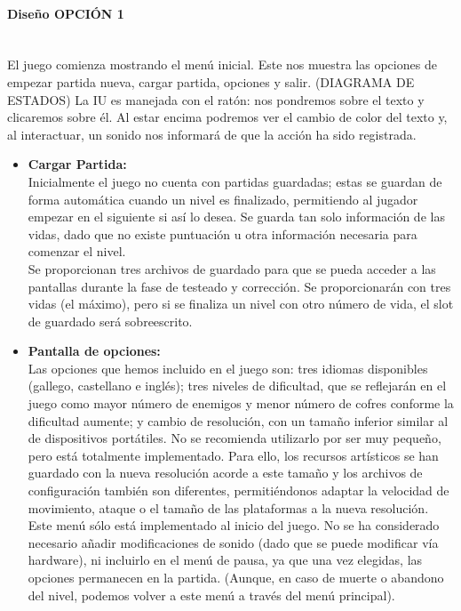 \documentclass[12pt,a4paper,twoside,spanish]{article}      %
\begin{document}
\paragraph{Diseño OPCIÓN 1}\mbox{}\\

El juego comienza mostrando el menú inicial. Este nos muestra las opciones de empezar partida nueva, cargar partida, opciones y salir. (DIAGRAMA DE ESTADOS) La IU es manejada con el ratón: nos pondremos sobre el texto y clicaremos sobre él. Al estar encima podremos ver el cambio de color del texto y, al interactuar, un sonido nos informará de que la acción ha sido registrada.

\begin{itemize}
    \item \textbf{Cargar Partida:}\\[1mm]
    Inicialmente el juego no cuenta con partidas guardadas; estas se guardan de forma automática cuando un nivel es finalizado, permitiendo al jugador empezar en el siguiente si así lo desea. Se guarda tan solo información de las vidas, dado que no existe puntuación u otra información necesaria para comenzar el nivel.\\[1mm]
    Se proporcionan tres archivos de guardado para que se pueda acceder a las pantallas durante la fase de testeado y corrección. Se proporcionarán con tres vidas (el máximo), pero si se finaliza un nivel con otro número de vida, el slot de guardado será sobreescrito.

    \item \textbf{Pantalla de opciones:}\\[1mm]
    Las opciones que hemos incluido en el juego son: tres idiomas disponibles (gallego, castellano e inglés); tres niveles de dificultad, que se reflejarán en el juego como mayor número de enemigos y menor número de cofres conforme la dificultad aumente; y cambio de resolución, con un tamaño inferior similar al de dispositivos portátiles. No se recomienda utilizarlo por ser muy pequeño, pero está totalmente implementado. Para ello, los recursos artísticos se han guardado con la nueva resolución acorde a este tamaño y los archivos de configuración también son diferentes, permitiéndonos adaptar la velocidad de movimiento, ataque o el tamaño de las plataformas a la nueva resolución.\\[1mm]
    Este menú sólo está implementado al inicio del juego. No se ha considerado necesario añadir modificaciones de sonido (dado que se puede modificar vía hardware), ni incluirlo en el menú de pausa, ya que una vez elegidas, las opciones permanecen en la partida. (Aunque, en caso de muerte o abandono del nivel, podemos volver a este menú a través del menú principal).


\end{itemize}
\end{document}
